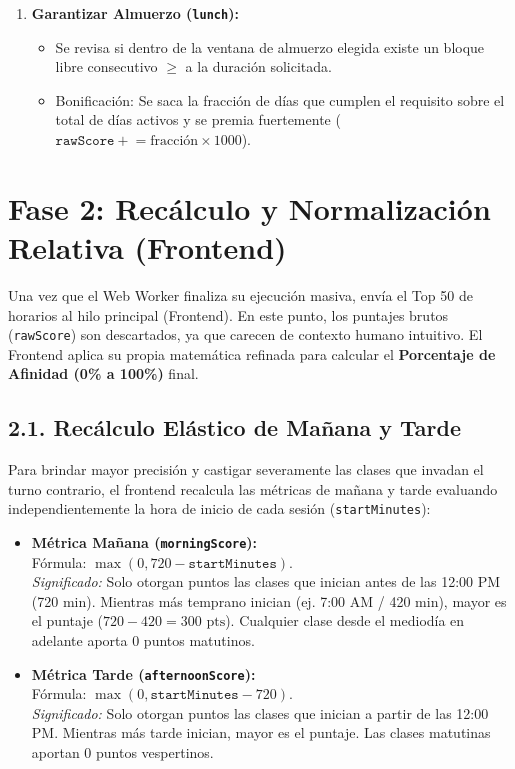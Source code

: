 \documentclass[12pt,a4paper]{article}
\begin{document}
\begin{enumerate}
    \item \textbf{Garantizar Almuerzo (\texttt{lunch}):}
    \begin{itemize}
        \item Se revisa si dentro de la ventana de almuerzo elegida existe un bloque libre consecutivo $\ge$ a la duración solicitada.
        \item Bonificación: Se saca la fracción de días que cumplen el requisito sobre el total de días activos y se premia fuertemente ($\texttt{rawScore} \mathrel{+}= \text{fracción} \times 1000$).
    \end{itemize}
\end{enumerate}

\section{Fase 2: Recálculo y Normalización Relativa (Frontend)}

Una vez que el Web Worker finaliza su ejecución masiva, envía el Top 50 de horarios al hilo principal (Frontend). En este punto, los puntajes brutos (\texttt{rawScore}) son descartados, ya que carecen de contexto humano intuitivo. El Frontend aplica su propia matemática refinada para calcular el \textbf{Porcentaje de Afinidad (0\% a 100\%)} final.

\subsection{2.1. Recálculo Elástico de Mañana y Tarde}
Para brindar mayor precisión y castigar severamente las clases que invadan el turno contrario, el frontend recalcula las métricas de mañana y tarde evaluando independientemente la hora de inicio de cada sesión (\texttt{startMinutes}):

\begin{itemize}
    \item \textbf{Métrica Mañana (\texttt{morningScore}):} \\
    Fórmula: $\max(0, 720 - \texttt{startMinutes})$. \\
    \textit{Significado:} Solo otorgan puntos las clases que inician antes de las 12:00 PM (720 min). Mientras más temprano inician (ej. 7:00 AM / 420 min), mayor es el puntaje ($720 - 420 = 300 \text{ pts}$). Cualquier clase desde el mediodía en adelante aporta $0$ puntos matutinos.
    
    \item \textbf{Métrica Tarde (\texttt{afternoonScore}):} \\
    Fórmula: $\max(0, \texttt{startMinutes} - 720)$. \\
    \textit{Significado:} Solo otorgan puntos las clases que inician a partir de las 12:00 PM. Mientras más tarde inician, mayor es el puntaje. Las clases matutinas aportan $0$ puntos vespertinos.
\end{itemize}
\end{document}
